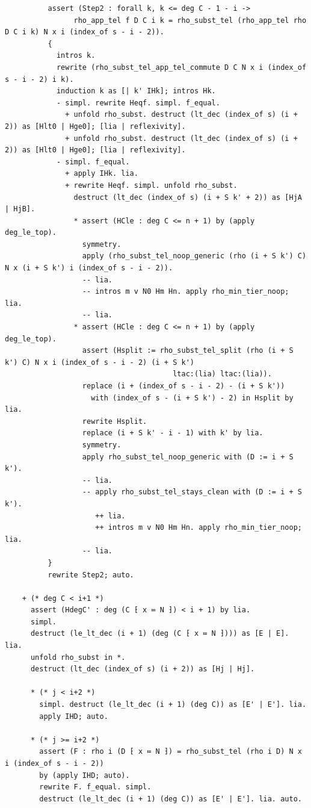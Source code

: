 \begin{latin}
\begin{verbatim}
          assert (Step2 : forall k, k <= deg C - 1 - i ->
                rho_app_tel f D C i k = rho_subst_tel (rho_app_tel rho D C i k) N x i (index_of s - i - 2)).
          {
            intros k.
            rewrite (rho_subst_tel_app_tel_commute D C N x i (index_of s - i - 2) i k).
            induction k as [| k' IHk]; intros Hk.
            - simpl. rewrite Heqf. simpl. f_equal.
              + unfold rho_subst. destruct (lt_dec (index_of s) (i + 2)) as [Hlt0 | Hge0]; [lia | reflexivity].
              + unfold rho_subst. destruct (lt_dec (index_of s) (i + 2)) as [Hlt0 | Hge0]; [lia | reflexivity].
            - simpl. f_equal.
              + apply IHk. lia.
              + rewrite Heqf. simpl. unfold rho_subst.
                destruct (lt_dec (index_of s) (i + S k' + 2)) as [HjA | HjB].
                * assert (HCle : deg C <= n + 1) by (apply deg_le_top).
                  symmetry.
                  apply (rho_subst_tel_noop_generic (rho (i + S k') C) N x (i + S k') i (index_of s - i - 2)).
                  -- lia.
                  -- intros m v N0 Hm Hn. apply rho_min_tier_noop; lia.
                  -- lia.
                * assert (HCle : deg C <= n + 1) by (apply deg_le_top).
                  assert (Hsplit := rho_subst_tel_split (rho (i + S k') C) N x i (index_of s - i - 2) (i + S k')
                                       ltac:(lia) ltac:(lia)).
                  replace (i + (index_of s - i - 2) - (i + S k'))
                    with (index_of s - (i + S k') - 2) in Hsplit by lia.
                  rewrite Hsplit.
                  replace (i + S k' - i - 1) with k' by lia.
                  symmetry.
                  apply rho_subst_tel_noop_generic with (D := i + S k').
                  -- lia.
                  -- apply rho_subst_tel_stays_clean with (D := i + S k').
                     ++ lia.
                     ++ intros m v N0 Hm Hn. apply rho_min_tier_noop; lia.
                  -- lia.
          }
          rewrite Step2; auto.

    + (* deg C < i+1 *)
      assert (HdegC' : deg (C ⁅ x ≔ N ⁆) < i + 1) by lia.
      simpl.
      destruct (le_lt_dec (i + 1) (deg (C ⁅ x ≔ N ⁆))) as [E | E]. lia.
      unfold rho_subst in *.
      destruct (lt_dec (index_of s) (i + 2)) as [Hj | Hj].

      * (* j < i+2 *)
        simpl. destruct (le_lt_dec (i + 1) (deg C)) as [E' | E']. lia.
        apply IHD; auto.

      * (* j >= i+2 *)
        assert (F : rho i (D ⁅ x ≔ N ⁆) = rho_subst_tel (rho i D) N x i (index_of s - i - 2))
        by (apply IHD; auto).
        rewrite F. f_equal. simpl.
        destruct (le_lt_dec (i + 1) (deg C)) as [E' | E']. lia. auto.


\end{verbatim}
\end{latin}
